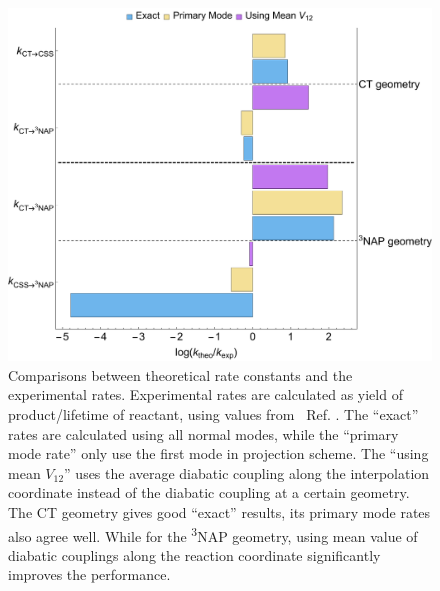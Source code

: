 \begin{figure}[!ht]
\includegraphics[width=\columnwidth]{Chapters/chap4/Images/kTCLME-VS-EXPT.pdf}
\caption{Comparisons between theoretical rate constants and the experimental rates. Experimental rates are calculated as yield of product/lifetime of reactant, using values from ~Ref. \cite{delor2015mechanism}.  The ``exact'' rates are calculated using all normal modes, while the ``primary mode rate'' only use the first mode in projection scheme. The ``using mean $V_{12}$'' uses the average diabatic coupling along the interpolation coordinate instead of the diabatic coupling at a certain geometry. The CT geometry gives good ``exact'' results, its primary mode rates also agree well. While for the \textsuperscript{3}NAP geometry, using mean value of diabatic couplings along the reaction coordinate significantly improves the performance.\label{rateComp}}
\end{figure}



